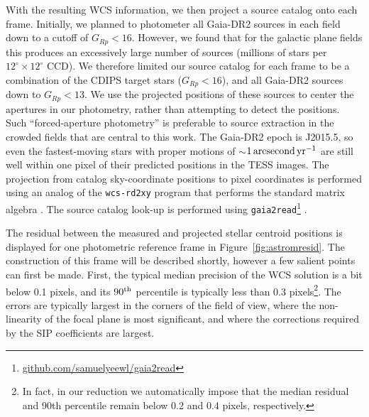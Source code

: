 \documentclass[12pt,twocolumn,tighten]{aastex62}
\begin{document}
With the resulting WCS information, we then project a source catalog
onto each frame.  Initially, we planned to photometer all Gaia-DR2
sources in each field down to a cutoff of $G_{Rp} < 16$.  However, we
found that for the galactic plane fields this produces an excessively
large number of sources (millions of stars per
$12^\circ\times12^\circ$ CCD).  We therefore limited our source
catalog for each frame to be
a combination of the CDIPS target stars ($G_{Rp} < 16$), and
all Gaia-DR2 sources down to $G_{Rp} < 13$.  We use the
projected positions of these sources to center the apertures in our
photometry,
rather than attempting to detect the positions.  Such
``forced-aperture photometry'' is preferable to source
extraction in the crowded fields that are central to this work.  The
Gaia-DR2 epoch is J2015.5, so even the fastest-moving stars with
proper motions of $\sim$$1\,{\rm arcsecond}\,{\rm yr}^{-1}$ are still
well within one pixel of their predicted positions in the TESS images.
The projection from catalog sky-coordinate positions to pixel
coordinates is performed using an analog of the \texttt{wcs-rd2xy}
program that performs the standard matrix algebra \citep{lang_2010}.
The source catalog look-up is performed using
\texttt{gaia2read}\footnote{\url{github.com/samuelyeewl/gaia2read}}
\citep{kim_2018_gaia2read}.

The residual between the measured and projected stellar centroid
positions is displayed for one photometric reference frame in
Figure~\ref{fig:astromresid}.
The construction of this frame will be described shortly, however
a few salient points can first be made.
First, the typical median precision of the WCS solution is a bit below
0.1 pixels, and its $90^{\rm th}$ percentile is typically less than
0.3 pixels\footnote{In fact, in our reduction we automatically impose
that the median residual and 90th percentile remain below 0.2 and 0.4
pixels, respectively.}.
The errors are typically largest in the corners of the field of view,
where the non-linearity of the focal plane is most significant, and
where the corrections required by the SIP coefficients are largest.
\end{document}
